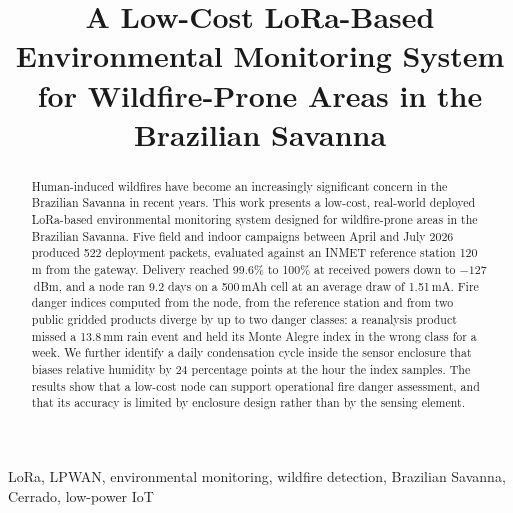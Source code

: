\documentclass[conference]{IEEEtran}
\newcommand{\ch}[1]{\textcolor{DiffOrange}{#1}}
\newcommand{\ch}[1]{#1}
\begin{document}
\title{A Low-Cost LoRa-Based Environmental Monitoring System for Wildfire-Prone Areas in the Brazilian Savanna}

\author{
\and
{}
\and
{}
}

\maketitle

\begin{abstract}
Human-induced wildfires have become an increasingly significant concern in the Brazilian Savanna in recent years. This work presents a low-cost, real-world deployed LoRa-based environmental monitoring system designed for wildfire-prone areas in the Brazilian Savanna. \ch{Five field and indoor campaigns between April and July 2026 produced 522 deployment packets, evaluated against an INMET reference station 120\,m from the gateway. Delivery reached 99.6\% to 100\% at received powers down to $-127$\,dBm, and a node ran 9.2 days on a 500\,mAh cell at an average draw of 1.51\,mA. Fire danger indices computed from the node, from the reference station and from two public gridded products diverge by up to two danger classes: a reanalysis product missed a 13.8\,mm rain event and held its Monte Alegre index in the wrong class for a week. We further identify a daily condensation cycle inside the sensor enclosure that biases relative humidity by 24 percentage points at the hour the index samples. The results show that a low-cost node can support operational fire danger assessment, and that its accuracy is limited by enclosure design rather than by the sensing element.}
\end{abstract}

\begin{IEEEkeywords}
LoRa, LPWAN, environmental monitoring, wildfire detection, Brazilian Savanna, Cerrado, low-power IoT
\end{IEEEkeywords}
\end{document}
